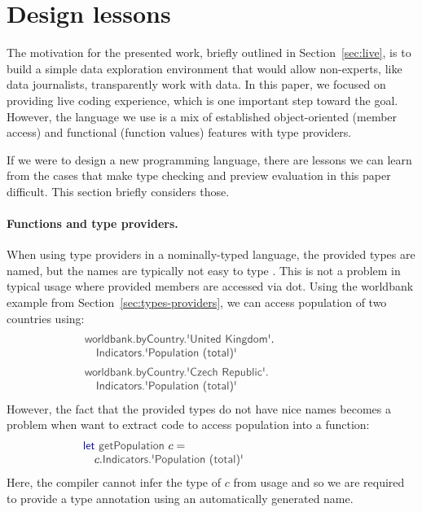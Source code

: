 \documentclass[acmsmall,anonymous,fleqn]{acmart}\settopmatter{printfolios=false,printccs=false,printacmref=false}
\theoremstyle{plain}
\theoremstyle{definition}
\newcommand{\ident}[1]{\textnormal{\textcolor{idclr}{\sffamily #1}}}
\newcommand{\kvd}[1]{\textnormal{\textcolor{kvdclr}{\sffamily #1}}}
\begin{document}

\section{Design lessons}
\label{sec:design}

The motivation for the presented work, briefly outlined in Section~\ref{sec:live}, is to build a
simple data exploration environment that would allow non-experts, like data journalists,
transparently work with data. In this paper, we focused on providing live coding experience,
which is one important step toward the goal. However, the language we use is a mix of established
object-oriented (member access) and functional (function values) features with type providers.

If we were to design a new programming language, there are lessons we can learn from the
cases that make type checking and preview evaluation in this paper difficult. This section
briefly considers those.

\paragraph{Functions and type providers.} When using type providers in a nominally-typed language,
the provided types are named, but the names are typically not easy to type \cite{fsdata}. This is
not a problem in typical usage where provided members are accessed via dot. Using the \ident{worldbank}
example from Section~\ref{sec:types-providers}, we can access population of two countries using:
%
\begin{equation*}
\begin{array}{l}
\ident{worldbank.byCountry.\textquotesingle United Kingdom\textquotesingle}.\\
\quad \ident{Indicators.\textquotesingle Population (total)\textquotesingle}\\[0.5em]
\ident{worldbank.byCountry.\textquotesingle Czech Republic\textquotesingle}.\\
\quad \ident{Indicators.\textquotesingle Population (total)\textquotesingle}\hspace{9em}
\end{array}
\end{equation*}
%
However, the fact that the provided types do not have nice names becomes a problem when want to
extract code to access population into a function:
%
\begin{equation*}
\begin{array}{l}
\kvd{let}~\ident{getPopulation}~c=\\
\quad c.\ident{Indicators.\textquotesingle Population (total)\textquotesingle}\hspace{8.5em}
\end{array}
\end{equation*}
%
Here, the compiler cannot infer the type of $c$ from usage and so we are required to provide a
type annotation using an automatically generated name.
\end{document}

